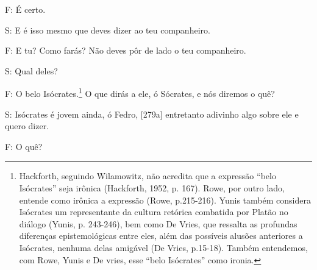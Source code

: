 F: É certo.

S: E é isso mesmo que deves dizer ao teu companheiro.

F: E tu? Como farás? Não deves pôr de lado o teu companheiro.

S: Qual deles?

F: O belo Isócrates.\footnote{Hackforth, seguindo Wilamowitz, não
  acredita que a expressão ``belo Isócrates'' seja irônica (Hackforth,
  1952, p. 167). Rowe, por outro lado, entende como irônica a expressão
  (Rowe, p.215-216). Yunis também considera Isócrates um representante
  da cultura retórica combatida por Platão no diálogo (Yunis, p.
  243-246), bem como De Vries, que ressalta as profundas diferenças
  epistemológicas entre eles, além das possíveis alusões anteriores a
  Isócrates, nenhuma delas amigável (De Vries, p.15-18). Também
  entendemos, com Rowe, Yunis e De vries, esse ``belo Isócrates'' como
  ironia.} O que dirás a ele, ó Sócrates, e nós diremos o quê?

S: Isócrates é jovem ainda, ó Fedro, {[}279a{]} entretanto adivinho algo
sobre ele e quero dizer.

F: O quê?

